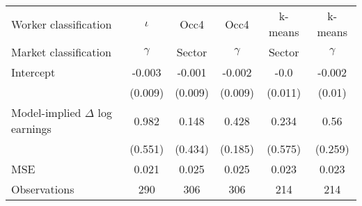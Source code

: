 \begin{tabular}{lccccc}
\toprule 
Worker classification 	 & $\iota$ 	 & Occ4 	 & Occ4 	 & k-means  	 & k-means  \\ 
Market classification 	 & $\gamma$ 	 & Sector 	 & $\gamma$ 	 & Sector  	 & $\gamma$  \\ 
\midrule 
Intercept & -0.003 & -0.001 & -0.002 & -0.0 & -0.002 \\ 
 & (0.009) & (0.009) & (0.009) & (0.011) & (0.01) \\ 
Model-implied $\Delta$ log earnings & 0.982 & 0.148 & 0.428 & 0.234 & 0.56 \\ 
 & (0.551) & (0.434) & (0.185) & (0.575) & (0.259) \\ 
\midrule 
MSE & 0.021 & 0.025 & 0.025 & 0.023 & 0.023 \\ 
Observations & 290 & 306 & 306 & 214 & 214 \\ 
\bottomrule 
\end{tabular}
